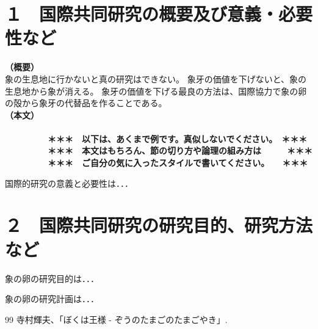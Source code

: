 \documentclass[11pt,a4j,dvipdfmx]{jarticle} 					%
\newcommand{\研究課題名}{象の卵}
\newcommand{\研究機関名}{逢坂大学}
\newcommand{\研究代表者氏名}{湯川秀樹}
\newcommand{\研究期間の最終元号年度}{10}  %
\begin{document}

\section{１　国際共同研究の概要及び意義・必要性など}

\JSPSInstructions		%
\noindent
\textbf{（概要）}\\
	象の生息地に行かないと真の研究はできない。
	象牙の価値を下げないと、象の生息地から象が消える。
	象牙の価値を下げる最良の方法は、国際協力で象の卵の殻から象牙の代替品を作ることである。
\\

\noindent
\textbf{（本文）}\\
\textbf{\\　　　　　＊＊＊　以下は、あくまで例です。真似しないでください。　＊＊＊\\
　　　　　＊＊＊　本文はもちろん、節の切り方や論理の組み方は　　　＊＊＊\\
　　　　　＊＊＊　ご自分の気に入ったスタイルで書いてください。　　＊＊＊}

	国際的研究の意義と必要性は．．．




\section{２　国際共同研究の研究目的、研究方法など}

	 象の卵の研究目的は．．．

	象の卵の研究計画は．．．

	\vspace{1cm}
	\begin{thebibliography}{99}
		 寺村輝夫、「ぼくは王様 - ぞうのたまごのたまごやき」.
	\end{thebibliography}
\end{document}

